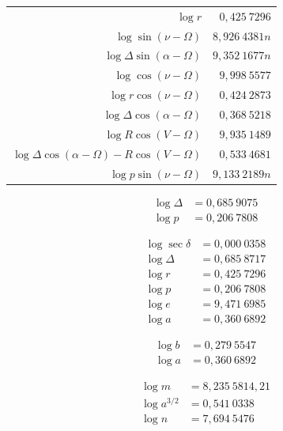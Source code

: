 \documentclass[12pt,a4paper]{article}
\theoremstyle{plain}
\theoremstyle{definition}
\theoremstyle{remark}
\begin{document}
\begin{center}
\begin{tabular}{r@{\quad}r}
$\log r$ & $0{,}425\ 7296$ \\
$\log \sin(\nu - \Omega)$ & $8{,}926\ 4381n$ \\
$\log \Delta \sin(\alpha - \Omega)$ & $9{,}352\ 1677n$ \\
$\log \cos(\nu - \Omega)$ & $9{,}998\ 5577$ \\
$\log r \cos(\nu - \Omega)$ & $0{,}424\ 2873$ \\
$\log \Delta \cos(\alpha - \Omega)$ & $0{,}368\ 5218$ \\
$\log R \cos(V - \Omega)$ & $9{,}935\ 1489$ \\
$\log \Delta \cos(\alpha - \Omega) - R \cos(V - \Omega)$ & $0{,}533\ 4681$ \\
$\log p \sin(\nu - \Omega)$ & $9{,}133\ 2189n$
\end{tabular}
\end{center}

\begin{align*}
\log \Delta &= 0{,}685\ 9075 \\
\log p &= 0{,}206\ 7808
\end{align*}

\begin{align*}
\log \sec\delta &= 0{,}000\ 0358 \\
\log \Delta &= 0{,}685\ 8717 \\
\log r &= 0{,}425\ 7296 \\
\log p &= 0{,}206\ 7808 \\
\log e &= 9{,}471\ 6985 \\
\log a &= 0{,}360\ 6892
\end{align*}

\begin{align*}
\log b &= 0{,}279\ 5547 \\
\log a &= 0{,}360\ 6892
\end{align*}

\newpage

\begin{align*}
\log m &= 8{,}235\ 5814{,}21 \\
\log a^{3/2} &= 0{,}541\ 0338 \\
\log n &= 7{,}694\ 5476
\end{align*}
\end{document}
